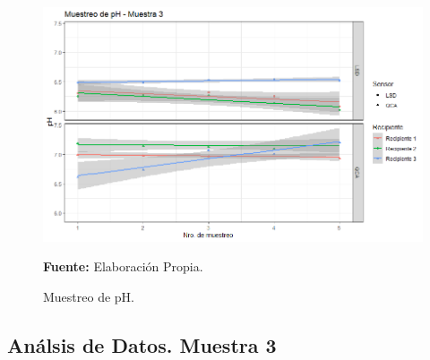 \begin{figure}[H]
        \centering
        \includegraphics[width=0.75\linewidth]{Imagenes/cap4/pH_M3.png}
        \caption {Muestreo de pH. }{\textbf{Fuente:}
        Elaboraci\'on Propia. }
        \label{fig:M3PH}
\end{figure}

\subsection{An\'alsis de Datos. Muestra 3}


